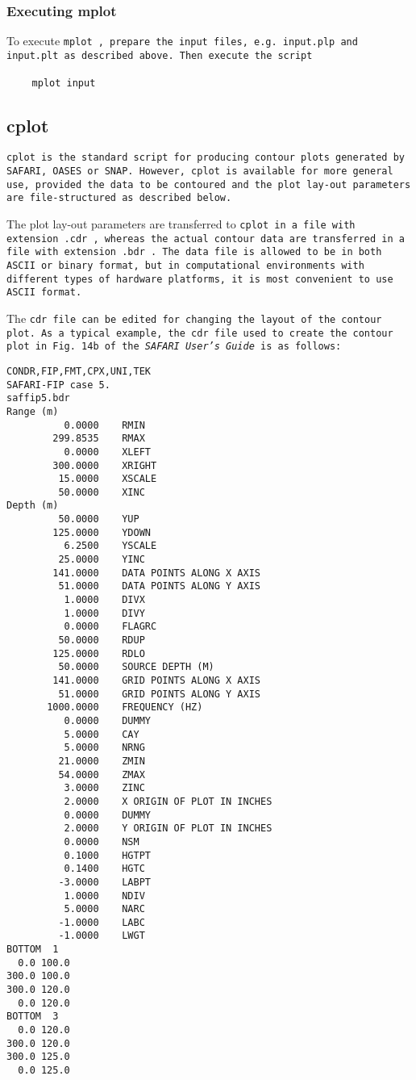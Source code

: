 \subsubsection{Executing mplot}

To execute \tt mplot \rm, prepare the input files,
e.g. \tt input.plp \rm  and \tt input.plt \rm   as described above. 
Then execute the script
\begin{itemize}
\item[$\>$] \tt mplot input \rm
\end{itemize}

\subsection{cplot}
\label{sec:cplot}

\tt cplot \rm is the standard script for producing contour plots
generated by SAFARI, OASES or SNAP.
However, \tt cplot \rm is available for more general
use, provided the data to be contoured and the plot lay-out parameters
are  file-structured as
described below. 

The plot lay-out parameters are transferred to \tt cplot \rm in a file
with extension \tt .cdr \rm, whereas the actual contour data are
transferred in a file
with extension \tt .bdr \rm. 
The data file is allowed to be in both ASCII or binary 
format, but in computational environments with different types of
hardware platforms, it
is most convenient to use ASCII format.

The \tt cdr \rm file can be edited for changing the layout of the 
contour plot. As
a typical example, the \tt cdr \rm  file used to create the contour plot in 
Fig. 14b of the {\em SAFARI User's Guide}  is as follows:

\small
\begin{verbatim}
CONDR,FIP,FMT,CPX,UNI,TEK 	
SAFARI-FIP case 5.  
saffip5.bdr          
Range (m)         	
          0.0000    RMIN
        299.8535    RMAX
          0.0000    XLEFT	
        300.0000    XRIGHT	
         15.0000    XSCALE	
         50.0000    XINC	
Depth (m)         	
         50.0000    YUP	
        125.0000    YDOWN	
          6.2500    YSCALE	
         25.0000    YINC	
        141.0000    DATA POINTS ALONG X AXIS	
         51.0000    DATA POINTS ALONG Y AXIS	
          1.0000    DIVX 	
          1.0000    DIVY 	
          0.0000    FLAGRC 	
         50.0000    RDUP 	
        125.0000    RDLO 	
         50.0000    SOURCE DEPTH (M)
        141.0000    GRID POINTS ALONG X AXIS 
         51.0000    GRID POINTS ALONG Y AXIS 
       1000.0000    FREQUENCY (HZ)	
          0.0000    DUMMY 
          5.0000    CAY 	
          5.0000    NRNG 	
         21.0000    ZMIN 	
         54.0000    ZMAX 	
          3.0000    ZINC 	
          2.0000    X ORIGIN OF PLOT IN INCHES
          0.0000    DUMMY 	
          2.0000    Y ORIGIN OF PLOT IN INCHES
          0.0000    NSM   	
          0.1000    HGTPT 	
          0.1400    HGTC 	
         -3.0000    LABPT 	
          1.0000    NDIV 	
          5.0000    NARC 	
         -1.0000    LABC 	
         -1.0000    LWGT 	
BOTTOM  1
  0.0 100.0
300.0 100.0
300.0 120.0
  0.0 120.0
BOTTOM  3
  0.0 120.0
300.0 120.0
300.0 125.0
  0.0 125.0
\end{verbatim}
\normalsize

